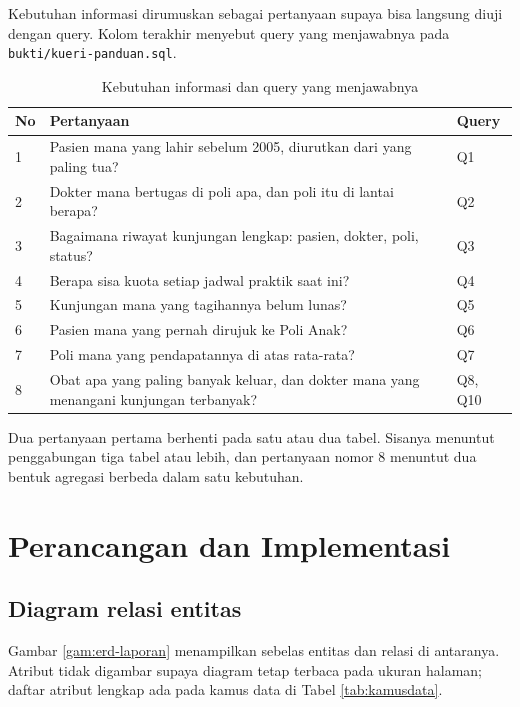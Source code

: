 \documentclass[12pt,a4paper]{article}
\begin{document}
Kebutuhan informasi dirumuskan sebagai pertanyaan supaya bisa langsung diuji
dengan query. Kolom terakhir menyebut query yang menjawabnya pada
\texttt{bukti/kueri-panduan.sql}.

\begin{table}[ht]
\centering
\caption{Kebutuhan informasi dan query yang menjawabnya}
\small
\begin{tabularx}{\textwidth}{@{}p{0.7cm}Xp{2.2cm}@{}}
\toprule
\textbf{No} & \textbf{Pertanyaan} & \textbf{Query} \\
\midrule
1 & Pasien mana yang lahir sebelum 2005, diurutkan dari yang paling tua? & Q1 \\
2 & Dokter mana bertugas di poli apa, dan poli itu di lantai berapa? & Q2 \\
3 & Bagaimana riwayat kunjungan lengkap: pasien, dokter, poli, status? & Q3 \\
4 & Berapa sisa kuota setiap jadwal praktik saat ini? & Q4 \\
5 & Kunjungan mana yang tagihannya belum lunas? & Q5 \\
6 & Pasien mana yang pernah dirujuk ke Poli Anak? & Q6 \\
7 & Poli mana yang pendapatannya di atas rata-rata? & Q7 \\
8 & Obat apa yang paling banyak keluar, dan dokter mana yang menangani kunjungan terbanyak? & Q8, Q10 \\
\bottomrule
\end{tabularx}
\end{table}

Dua pertanyaan pertama berhenti pada satu atau dua tabel. Sisanya menuntut
penggabungan tiga tabel atau lebih, dan pertanyaan nomor 8 menuntut dua bentuk
agregasi berbeda dalam satu kebutuhan.

\section{Perancangan dan Implementasi}

\subsection{Diagram relasi entitas}

Gambar \ref{gam:erd-laporan} menampilkan sebelas entitas dan relasi di
antaranya. Atribut tidak digambar supaya diagram tetap terbaca pada ukuran
halaman; daftar atribut lengkap ada pada kamus data di Tabel
\ref{tab:kamusdata}.
\end{document}
